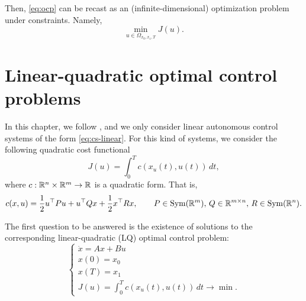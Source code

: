 Then, \eqref{eq:ocp} can be recast as an (infinite-dimensional) optimization problem under constraints. Namely,
\begin{equation}
    \min_{u\in \Omega_{x_0,x_1,T}} J(u).
\end{equation}

\section{Linear-quadratic optimal control problems}

In this chapter, we follow \cite{jurdjevicGeometric1997}, and we only consider linear autonomous control systems of the form \eqref{eq:cs-linear}.
For this kind of systems, we consider the following quadratic cost functional
\begin{equation}
    J(u) = \int_0^T c(x_u(t),u(t))\, dt,
\end{equation}
where $c:\mathbb{R}^n\times \mathbb{R}^m \to \mathbb{R}$ is a quadratic form. That is,
\begin{equation}
    c(x,u) = \frac12 u^\top Pu + u^\top Qx + \frac12 x^\top R x,
     \qquad P\in \operatorname{Sym}(\mathbb{R}^{m}), \, Q \in \mathbb{R}^{m\times n},\, R\in \operatorname{Sym}(\mathbb{R}^n).
\end{equation}

The first question to be answered is the existence of solutions to the corresponding linear-quadratic (LQ) optimal control problem:
\begin{equation}
   \label{eq:ocp-linear}
   \begin{cases}
    \dot x = A x + Bu \\
    x(0)=x_0 \\
    x(T) = x_1 \\
    J(u) = \int_0^T c(x_u(t),u(t))\, dt \rightarrow \min.
   \end{cases} 
\end{equation}


